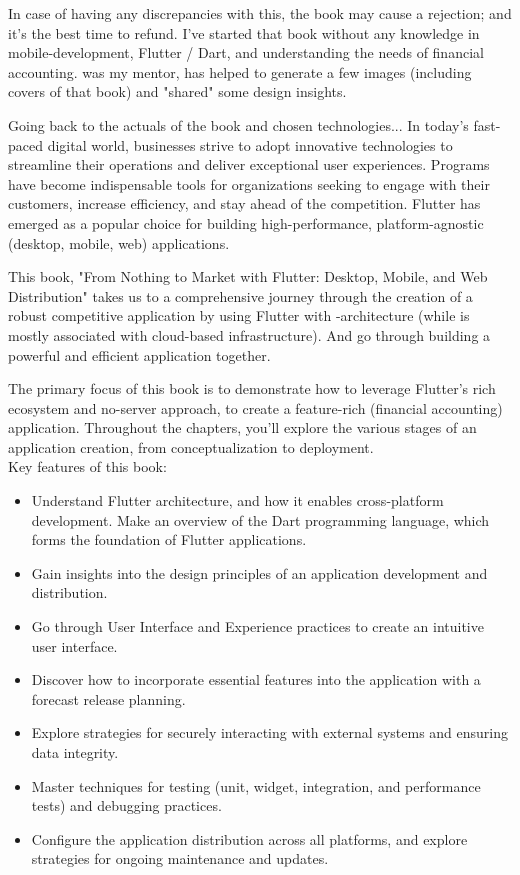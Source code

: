 \noindent In case of having any discrepancies with this, the book may cause a rejection; and it's the best time to 
refund. I've started that book without any knowledge in mobile-development, Flutter / Dart, and understanding the needs
of financial accounting.  was my mentor,  has helped to generate a few images (including 
covers of that book) and "shared" some design insights.

Going back to the actuals of the book and chosen technologies... In today's fast-paced digital world, businesses strive 
to adopt innovative technologies to streamline their operations and deliver exceptional user experiences. Programs have 
become indispensable tools for organizations seeking to engage with their customers, increase efficiency, and stay 
ahead of the competition. Flutter has emerged as a popular choice for building high-performance, platform-agnostic 
(desktop, mobile, web) applications.

This book, "From Nothing to Market with Flutter: Desktop, Mobile, and Web Distribution" takes us to a comprehensive 
journey through the creation of a robust competitive application by using Flutter with -architecture (while 
 is mostly associated with cloud-based infrastructure). And go through building a powerful and efficient 
application together.

The primary focus of this book is to demonstrate how to leverage Flutter's rich ecosystem and no-server approach, 
to create a feature-rich (financial accounting) application. Throughout the chapters, you'll explore the various 
stages of an application creation, from conceptualization to deployment.
\\
\noindent Key features of this book:
\begin{itemize}
    \item Understand Flutter architecture, and how it enables cross-platform development. Make an overview of 
    the Dart programming language, which forms the foundation of Flutter applications.

    \item Gain insights into the design principles of an application development and distribution. 
    
    \item Go through User Interface and Experience practices to create an intuitive user interface.

    \item Discover how to incorporate essential features into the application with a forecast release planning.

    \item Explore strategies for securely interacting with external systems and ensuring data integrity.

    \item Master techniques for testing (unit, widget, integration, and performance tests) and debugging practices. 

    \item Configure the application distribution across all platforms, and explore strategies for ongoing 
    maintenance and updates.
\end{itemize}
